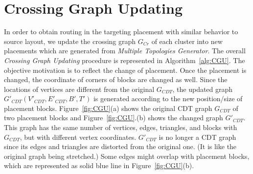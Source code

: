   \section{Crossing Graph Updating}\label{sec:updateG}


    In order to obtain routing in the targeting placement with similar behavior to source layout, we update the crossing graph $G_{Cr}$ of each cluster into new placements which are generated from {\it Multiple Topologies Generator}. The overall {\it Crossing Graph Updating} procedure is represented in Algorithm~\ref{alg:CGU}. The objective motivation is to reflect the change of placement. Once the placement is changed, the coordinate of corners of blocks are changed as well. Since the locations of vertices are different from the original $G_{CDT}$, the updated graph $G'_{CDT}(V'_{CDT},E'_{CDT},B',T')$ is generated according to the new position/size of placement blocks. Figure~\ref{fig:CGU}(a) shows the original CDT graph $G_{CDT}$ of two placement blocks and Figure~\ref{fig:CGU}.(b) shows the changed graph $G'_{CDT}$. This graph has the same number of vertices, edges, triangles, and blocks with $G_{CDT}$, but with different vertex coordinates. $G'_{CDT}$ is no longer a CDT graph since its edges and triangles are distorted from the original one. (It is like the original graph being stretched.) Some edges might overlap with placement blocks, which are represented as solid blue line in Figure~\ref{fig:CGU}(b).


